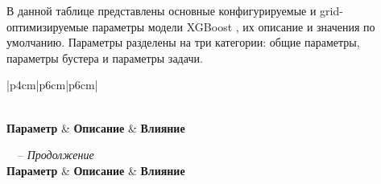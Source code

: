 \documentclass[14pt, a4paper]{bsu}
\begin{document}
В данной таблице представлены основные конфигурируемые и grid-оптимизируемые
параметры модели XGBoost \cite{xgboost_parameters_docs}, их описание и значения
по умолчанию. Параметры разделены на три категории: общие параметры, параметры
бустера и параметры задачи.

\begin{longtable}{|p{4cm}|p{6cm}|p{6cm}|} \caption{Параметры XGBoost и их
		влияние}\label{tab:xgboost_params}
	\\

	\hline \textbf{Параметр}                          & \textbf{Описание}
	                                                  & \textbf{Влияние}
	\\ \hline \endfirsthead

	 {\tablename\ \thetable\ -- \textit{Продолжение}}
	\\ \hline \textbf{Параметр}             & \textbf{Описание}
	                                                  & \textbf{Влияние}
	\\ \hline \endhead

	\hline {}
	\\ \hline \endfoot

	\hline \endlastfoot


\end{longtable}
\end{document}
